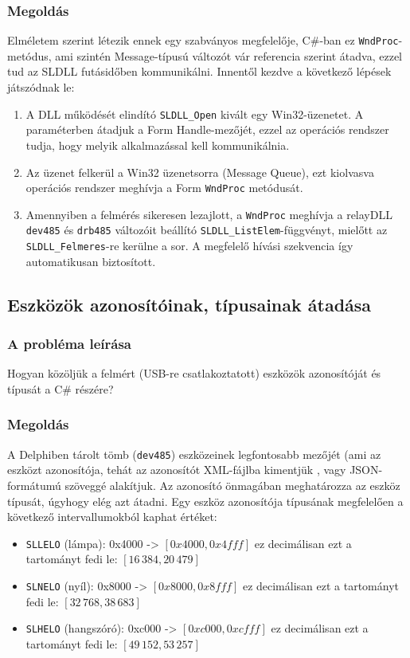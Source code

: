 \documentclass[tocnopagenum]{thesis-ekf}
\begin{document}
	\subsubsection{Megoldás}
	\label{wndproc}
	Elméletem szerint létezik ennek egy szabványos megfelelője, C\#-ban ez \verb*|WndProc|-metódus, ami szintén Message-típusú változót vár referencia szerint átadva, ezzel tud az SLDLL futásidőben kommunikálni.
	Innentől kezdve a következő lépések játszódnak le:
	\begin{enumerate}
		\item A DLL működését elindító \verb*|SLDLL_Open| kivált egy Win32-üzenetet. A paraméterben átadjuk a Form Handle-mezőjét, ezzel az operációs rendszer tudja, hogy melyik alkalmazással kell kommunikálnia.
		\item Az üzenet felkerül a Win32 üzenetsorra (Message Queue), ezt kiolvasva operációs rendszer meghívja a Form \verb*|WndProc| metódusát.
		\item Amennyiben a felmérés sikeresen lezajlott, a \verb*|WndProc| meghívja a relayDLL \verb*|dev485| és \verb*|drb485| változóit beállító \verb*|SLDLL_ListElem|-függvényt, mielőtt az \verb*|SLDLL_Felmeres|-re kerülne a sor. A megfelelő hívási szekvencia így automatikusan biztosított.
	\end{enumerate}
	\subsection{Eszközök azonosítóinak, típusainak átadása}
	\subsubsection{A probléma leírása} Hogyan közöljük a felmért (USB-re csatlakoztatott) eszközök azonosítóját és típusát a C\# részére?
	\subsubsection{Megoldás}
	A Delphiben tárolt tömb (\verb*|dev485|) eszközeinek legfontosabb mezőjét (ami az eszközt azonosítója, tehát az azonosítót XML-fájlba kimentjük \cite{sof_xmlcreate}, vagy JSON-formátumú szöveggé alakítjuk. Az azonosító önmagában meghatározza az eszköz típusát, úgyhogy elég azt átadni.
	Egy eszköz azonosítója típusának megfelelően a következő intervallumokból kaphat értéket:
	\begin{itemize}
		\item \verb*|SLLELO| (lámpa): 0x4000 -> $[0x4000,0x4fff]$ ez decimálisan ezt a tartományt fedi le: $[16\,384,20\,479]$
		\item \verb*|SLNELO| (nyíl): 0x8000 -> $[0x8000,0x8fff]$ ez decimálisan ezt a tartományt fedi le: $[32\,768,38\,683]$
		\item \verb*|SLHELO| (hangszóró): 0xc000 -> $[0xc000,0xcfff]$ ez decimálisan ezt a tartományt fedi le: $[49\,152,53\,257]$
	\end{itemize}
	
\end{document}

